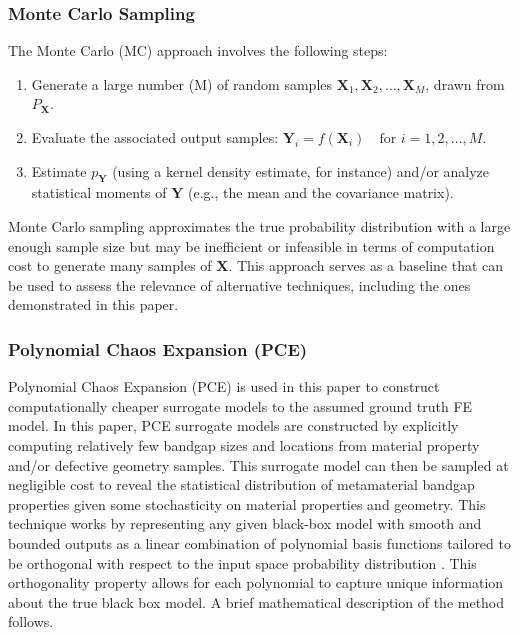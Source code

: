 \documentclass[preprint,review,12pt]{elsarticle}
\begin{document}
\subsubsection{Monte Carlo Sampling}
The Monte Carlo (MC) approach involves the following steps:
\begin{enumerate}
    \item Generate a large number (M) of random samples $\mathbf{X}_1, \mathbf{X}_2, \dots, \mathbf{X}_M$, drawn from $P_{\mathbf{X}}$.
    \item Evaluate the associated output samples: $\mathbf{Y}_i = f(\mathbf{X}_i) \quad \text{for } i = 1,2, \dots, M$.
    \item Estimate $p_{\mathbf{Y}}$ (using a kernel density estimate, for instance) and/or analyze statistical moments of $\mathbf{Y}$ (e.g., the mean and the covariance matrix).
\end{enumerate}

Monte Carlo sampling approximates the true probability distribution with a large enough sample size but may be inefficient or infeasible in terms of computation cost to generate many samples of $\mathbf{X}$. This approach serves as a baseline that can be used to assess the relevance of alternative techniques, including the ones demonstrated in this paper.
\subsubsection{Polynomial Chaos Expansion (PCE)}
Polynomial Chaos Expansion (PCE) is used in this paper to construct computationally cheaper surrogate models to the assumed ground truth FE model. In this paper, PCE surrogate models are constructed by explicitly computing relatively few bandgap sizes and locations from material property and/or defective geometry samples. This surrogate model can then be sampled at negligible cost to reveal the statistical distribution of metamaterial bandgap properties given some stochasticity on material properties and geometry. This technique works by representing any given black-box model with smooth and bounded outputs as a linear combination of polynomial basis functions tailored to be orthogonal with respect to the input space probability distribution \cite{sudret2008global, crestaux2009polynomial}. This orthogonality property allows for each polynomial to capture unique information about the true black box model. A brief mathematical description of the method follows.
\end{document}
